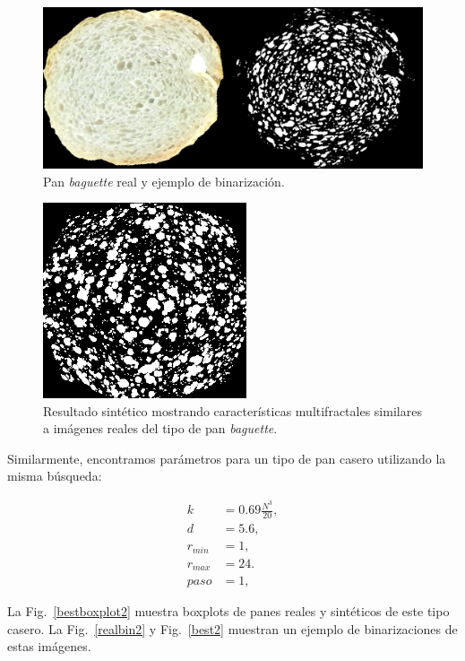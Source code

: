 \begin{figure}[!ht]
\begin{center}
\includegraphics[width=13cm]{figures/realbin}
\caption{ Pan {\em baguette} real y ejemplo de binarización.}
\label{realbin}
\end{center}
\end{figure}

\begin{figure}[!ht]
\begin{center}
\includegraphics[width=6cm]{figures/best}
\caption{Resultado sintético mostrando características multifractales similares a imágenes reales del tipo de pan {\em baguette}.}
\label{best}
\end{center}
\end{figure}

Similarmente, encontramos parámetros para un tipo de pan casero utilizando la misma búsqueda:

\begin{align*}
k &= 0.69 \frac{N^{3}}{20} ,\\
d &=5.6,\\
r_{min} &=1,\\
r_{max} &=24.\\
paso &=1,
\end{align*}

La Fig.~\ref{bestboxplot2} muestra boxplots de panes reales y sintéticos de este tipo casero.
La Fig.~\ref{realbin2} y  Fig.~\ref{best2} muestran un ejemplo de binarizaciones de estas imágenes. 


